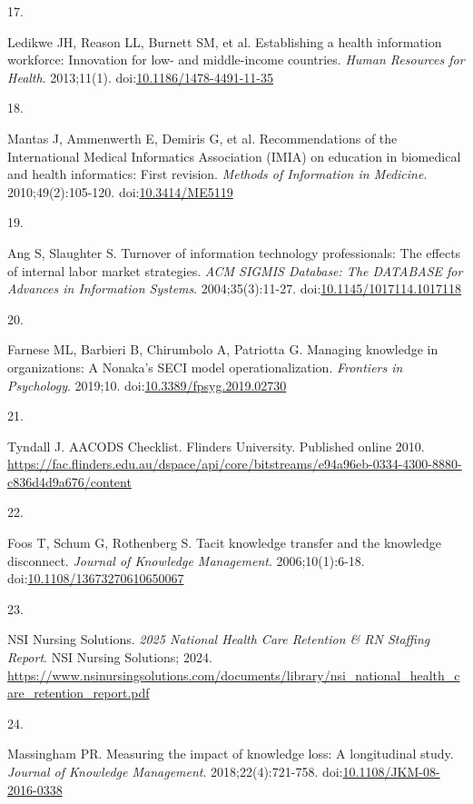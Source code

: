 \documentclass[
  american,
  11pt,
  letterpaper,
  oneside  ,captions=tableheading
]{scrartcl}
\newlength{\cslhangindent}
\newlength{\csllabelwidth}
\newenvironment{CSLReferences}[2] %
 {\begin{list}{}{%
  \setlength{\itemindent}{0pt}
  \setlength{\leftmargin}{0pt}
  \setlength{\parsep}{0pt}
  \ifodd #1
   \setlength{\leftmargin}{\cslhangindent}
   \setlength{\itemindent}{-1\cslhangindent}
  \fi
  \setlength{\itemsep}{#2\baselineskip}}}
 {\end{list}}
\newcommand{\CSLLeftMargin}[1]{\parbox[t]{\csllabelwidth}{\strut#1\strut}}
\newcommand{\CSLRightInline}[1]{\parbox[t]{\linewidth - \csllabelwidth}{\strut#1\strut}}
\begin{document}
\begin{CSLReferences}{0}{1}
\CSLLeftMargin{17. }%
\CSLRightInline{Ledikwe JH, Reason LL, Burnett SM, et al. {Establishing
a health information workforce: Innovation for low- and middle-income
countries}. \emph{Human Resources for Health}. 2013;11(1).
doi:\href{https://doi.org/10.1186/1478-4491-11-35}{10.1186/1478-4491-11-35}}

\CSLLeftMargin{18. }%
\CSLRightInline{Mantas J, Ammenwerth E, Demiris G, et al.
{Recommendations of the International Medical Informatics Association
(IMIA) on education in biomedical and health informatics: First
revision}. \emph{Methods of Information in Medicine}.
2010;49(2):105-120.
doi:\href{https://doi.org/10.3414/ME5119}{10.3414/ME5119}}

\CSLLeftMargin{19. }%
\CSLRightInline{Ang S, Slaughter S. {Turnover of information technology
professionals: The effects of internal labor market strategies}.
\emph{{ACM} {SIGMIS} Database: The {DATABASE} for Advances in
Information Systems}. 2004;35(3):11-27.
doi:\href{https://doi.org/10.1145/1017114.1017118}{10.1145/1017114.1017118}}

\CSLLeftMargin{20. }%
\CSLRightInline{Farnese ML, Barbieri B, Chirumbolo A, Patriotta G.
{Managing knowledge in organizations: A Nonaka's {SECI} model
operationalization}. \emph{Frontiers in Psychology}. 2019;10.
doi:\href{https://doi.org/10.3389/fpsyg.2019.02730}{10.3389/fpsyg.2019.02730}}

\CSLLeftMargin{21. }%
\CSLRightInline{Tyndall J. {{AACODS} Checklist. Flinders University}.
Published online 2010.
\url{https://fac.flinders.edu.au/dspace/api/core/bitstreams/e94a96eb-0334-4300-8880-c836d4d9a676/content}}

\CSLLeftMargin{22. }%
\CSLRightInline{Foos T, Schum G, Rothenberg S. {Tacit knowledge transfer
and the knowledge disconnect}. \emph{Journal of Knowledge Management}.
2006;10(1):6-18.
doi:\href{https://doi.org/10.1108/13673270610650067}{10.1108/13673270610650067}}

\CSLLeftMargin{23. }%
\CSLRightInline{NSI Nursing Solutions. \emph{{2025 National Health Care
Retention \& RN Staffing Report}}. NSI Nursing Solutions; 2024.
\url{https://www.nsinursingsolutions.com/documents/library/nsi_national_health_care_retention_report.pdf}}

\CSLLeftMargin{24. }%
\CSLRightInline{Massingham PR. {Measuring the impact of knowledge loss:
A longitudinal study}. \emph{Journal of Knowledge Management}.
2018;22(4):721-758.
doi:\href{https://doi.org/10.1108/JKM-08-2016-0338}{10.1108/JKM-08-2016-0338}}


\end{CSLReferences}
\end{document}
